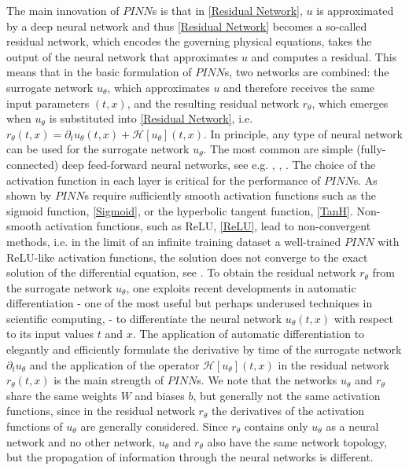 The main innovation of $PINN$s is that in \cref{Residual Network}, $u$ is approximated by a deep neural network and thus \cref{Residual Network} becomes a so-called residual network, which encodes the governing physical equations, takes the output of the neural network that approximates $u$ and computes a residual. This means that in the basic formulation of $PINN$s, two networks are combined: the surrogate network $u_\theta$, which approximates $u$ and therefore receives the same input parameters $\left(t,x\right)$, and the resulting residual network $r_\theta$, which emerges when $u_\theta$ is substituted into \cref{Residual Network}, i.e. $r_\theta\left(t,x\right) = \partial_t u_\theta \left(t,x\right) + \mathcal{H} \left[ u_\theta \right] \left(t, x\right)$. In principle, any type of neural network can be used for the surrogate network $u_\theta$. The most common are simple (fully-connected) deep feed-forward neural networks, see e.g. \cite{RaissiPerdikarisKarniadakis:2019}, \cite{BlechschmidtErnst:2021}, \cite{Markidis:2021}. The choice of the activation function in each layer is critical for the performance of $PINN$s. As shown by \cite{MishraMolinaro:2021} $PINN$s require sufficiently smooth activation functions such as the sigmoid function, \cref{Sigmoid}, or the hyperbolic tangent function, \cref{TanH}. Non-smooth activation functions, such as ReLU, \cref{ReLU}, lead to non-convergent methods, i.e. in the limit of an infinite training dataset a well-trained $PINN$ with ReLU-like activation functions, the solution does not converge to the exact solution of the differential equation, see \cite{MishraMolinaro:2021}. To obtain the residual network $r_\theta$ from the surrogate network $u_\theta$, one exploits recent developments in automatic differentiation - one of the most useful but perhaps underused techniques in scientific computing, \cite[p.~3]{RaissiPerdikarisKarniadakisPart1:2017} - to differentiate the neural network $u_\theta\left(t,x\right)$ with respect to its input values $t$ and $x$. The application of automatic differentiation to elegantly and efficiently formulate the derivative by time of the surrogate network $\partial_t u_\theta$ and the application of the operator $\mathcal{H} \left[ u_\theta \right] \left(t,x\right)$ in the residual network $r_\theta\left(t,x\right)$ is the main strength of $PINN$s. We note that the networks $u_\theta$ and $r_\theta$ share the same weights $W$ and biases $b$, but generally not the same activation functions, since in the residual network $r_\theta$ the derivatives of the activation functions of $u_\theta$ are generally considered. Since $r_\theta$ contains only $u_\theta$ as a neural network and no other network, $u_\theta$ and $r_\theta$ also have the same network topology, but the propagation of information through the neural networks is different. \\

